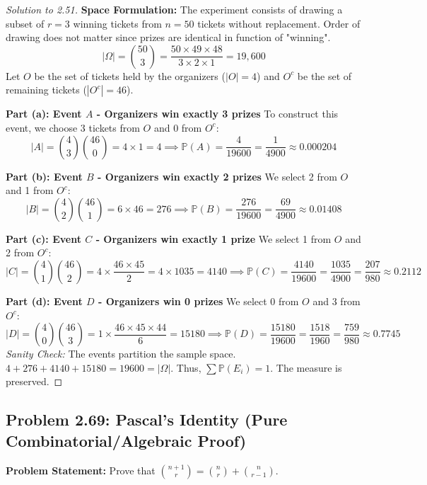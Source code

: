\documentclass[11pt]{article}
\theoremstyle{definition}
\theoremstyle{plain}
\theoremstyle{remark}
\newcommand{\Prob}{\mathbb{P}}
\newcommand{\sample}{\Omega}
\begin{document}
\begin{proof}[Solution to 2.51]
\textbf{Space Formulation:} 
The experiment consists of drawing a subset of $r=3$ winning tickets from $n=50$ tickets without replacement. Order of drawing does not matter since prizes are identical in function of "winning".
\[
|\sample| = \binom{50}{3} = \frac{50 \times 49 \times 48}{3 \times 2 \times 1} = 19,600
\]
Let $O$ be the set of tickets held by the organizers ($|O| = 4$) and $O^c$ be the set of remaining tickets ($|O^c| = 46$).

\textbf{Part (a): Event $A$ - Organizers win exactly 3 prizes}
To construct this event, we choose 3 tickets from $O$ and 0 from $O^c$:
\[
|A| = \binom{4}{3} \binom{46}{0} = 4 \times 1 = 4 \implies \Prob(A) = \frac{4}{19600} = \frac{1}{4900} \approx 0.000204
\]

\textbf{Part (b): Event $B$ - Organizers win exactly 2 prizes}
We select 2 from $O$ and 1 from $O^c$:
\[
|B| = \binom{4}{2} \binom{46}{1} = 6 \times 46 = 276 \implies \Prob(B) = \frac{276}{19600} = \frac{69}{4900} \approx 0.01408
\]

\textbf{Part (c): Event $C$ - Organizers win exactly 1 prize}
We select 1 from $O$ and 2 from $O^c$:
\[
|C| = \binom{4}{1} \binom{46}{2} = 4 \times \frac{46 \times 45}{2} = 4 \times 1035 = 4140 \implies \Prob(C) = \frac{4140}{19600} = \frac{1035}{4900} = \frac{207}{980} \approx 0.2112
\]

\textbf{Part (d): Event $D$ - Organizers win 0 prizes}
We select 0 from $O$ and 3 from $O^c$:
\[
|D| = \binom{4}{0} \binom{46}{3} = 1 \times \frac{46 \times 45 \times 44}{6} = 15180 \implies \Prob(D) = \frac{15180}{19600} = \frac{1518}{1960} = \frac{759}{980} \approx 0.7745
\]
\textit{Sanity Check:} The events partition the sample space. $4 + 276 + 4140 + 15180 = 19600 = |\sample|$. Thus, $\sum \Prob(E_i) = 1$. The measure is preserved.
\end{proof}

\subsection{Problem 2.69: Pascal's Identity (Pure Combinatorial/Algebraic Proof)}
\textbf{Problem Statement:} Prove that $\binom{n+1}{r} = \binom{n}{r} + \binom{n}{r-1}$.
\end{document}
